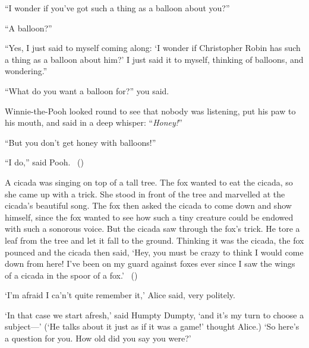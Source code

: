 \begin{note}
  \begin{scenario}
    ``I wonder if you've got such a thing as a balloon about you?''

    \noindent%
    ``A balloon?''

    \noindent%
    ``Yes, I just said to myself coming along:
    `I wonder if Christopher Robin has such a thing as a balloon about him?'
    I just said it to myself, thinking of balloons, and wondering.''

    \noindent%
    ``What do you want a balloon for?'' you said.

    \noindent%
    Winnie-the-Pooh looked round to see that nobody was listening, put his paw to his mouth, and said in a deep whisper:
    ``\emph{Honey!}''

    \noindent%
    ``But you don't get honey with balloons!''

    \noindent%
    ``I do,'' said Pooh.%
    \mbox{ }\hfill\mbox{(\cite[12]{Milne:2009aa})}\newline
    \mbox{ }
  \end{scenario}

  \begin{scenario}
    A cicada was singing on top of a tall tree.
    The fox wanted to eat the cicada, so she came up with a trick.
    She stood in front of the tree and marvelled at the cicada's beautiful song.
    The fox then asked the cicada to come down and show himself, since the fox wanted to see how such a tiny creature could be endowed with such a sonorous voice.
    But the cicada saw through the fox's trick.
    He tore a leaf from the tree and let it fall to the ground.
    Thinking it was the cicada, the fox pounced and the cicada then said,
    `Hey, you must be crazy to think I would come down from here! I've been on my guard against foxes ever since I saw the wings of a cicada in the spoor of a fox.'%
    \mbox{ }\hfill\mbox{(\cite[136]{Aesop:2002aa})}\newline
    \mbox{ }
  \end{scenario}

  \begin{scenario}
    `I'm afraid I ca'n't quite remember it,'
    Alice said, very politely.

    \noindent%
    `In that case we start afresh,'
    said Humpty Dumpty,
    `and it's my turn to choose a subject---'
    (`He talks about it just as if it was a game!' thought Alice.)
    `So here's a question for you. How old did you say you were?'


\end{scenario}
\end{note}

